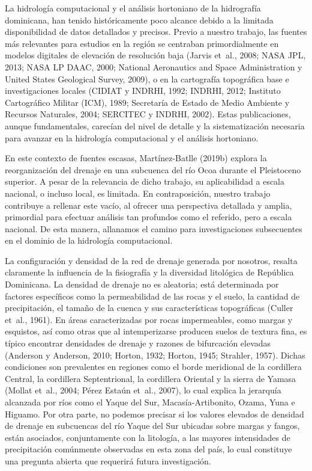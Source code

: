 \documentclass[spanish]{article}
\begin{document}
La hidrología computacional y el análisis hortoniano de la hidrografía
dominicana, han tenido históricamente poco alcance debido a la limitada
disponibilidad de datos detallados y precisos. Previo a nuestro trabajo,
las fuentes más relevantes para estudios en la región se centraban
primordialmente en modelos digitales de elevación de resolución baja
(Jarvis et~al., 2008; NASA JPL, 2013; NASA LP DAAC, 2000; National
Aeronautics and Space Administration y United States Geological Survey,
2009), o en la cartografía topográfica base e investigaciones locales
(CIDIAT y INDRHI, 1992; INDRHI, 2012; Instituto Cartográfico Militar
(ICM), 1989; Secretaría de Estado de Medio Ambiente y Recursos
Naturales, 2004; SERCITEC y INDRHI, 2002). Estas publicaciones, aunque
fundamentales, carecían del nivel de detalle y la sistematización
necesaria para avanzar en la hidrología computacional y el análisis
hortoniano.

En este contexto de fuentes escasas, Martínez-Batlle (2019b) explora la
reorganización del drenaje en una subcuenca del río Ocoa durante el
Pleistoceno superior. A pesar de la relevancia de dicho trabajo, su
aplicabilidad a escala nacional, o incluso local, es limitada. En
contraposición, nuestro trabajo contribuye a rellenar este vacío, al
ofrecer una perspectiva detallada y amplia, primordial para efectuar
análisis tan profundos como el referido, pero a escala nacional. De esta
manera, allanamos el camino para investigaciones subsecuentes en el
dominio de la hidrología computacional.

La configuración y densidad de la red de drenaje generada por nosotros,
resalta claramente la influencia de la fisiografía y la diversidad
litológica de República Dominicana. La densidad de drenaje no es
aleatoria; está determinada por factores específicos como la
permeabilidad de las rocas y el suelo, la cantidad de precipitación, el
tamaño de la cuenca y sus características topográficas (Culler et~al.,
1961). En áreas caracterizadas por rocas impermeables, como margas y
esquistos, así como otras que al intemperizarse producen suelos de
textura fina, es típico encontrar densidades de drenaje y razones de
bifurcación elevadas (Anderson y Anderson, 2010; Horton, 1932; Horton,
1945; Strahler, 1957). Dichas condiciones son prevalentes en regiones
como el borde meridional de la cordillera Central, la cordillera
Septentrional, la cordillera Oriental y la sierra de Yamasa (Mollat
et~al., 2004; Pérez Estaún et~al., 2007), lo cual explica la jerarquía
alcanzada por ríos como el Yaque del Sur, Macasía-Artibonito, Ozama,
Yuna e Higuamo. Por otra parte, no podemos precisar si los valores
elevados de densidad de drenaje en subcuencas del río Yaque del Sur
ubicadas sobre margas y fangos, están asociados, conjuntamente con la
litología, a las mayores intensidades de precipitación comúnmente
observadas en esta zona del país, lo cual constituye una pregunta
abierta que requerirá futura investigación.
\end{document}
